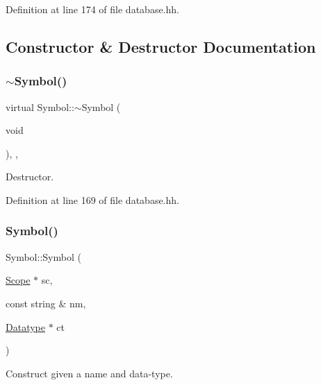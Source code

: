 Definition at line 174 of file database.\+hh.



\subsection{Constructor \& Destructor Documentation}
\mbox{\label{class_symbol_aaed4373bdbfb1cfea21a2b055da4b62b}} 
\subsubsection{\texorpdfstring{$\sim$Symbol()}{~Symbol()}}
{\footnotesize\ttfamily virtual Symbol\+::$\sim$\+Symbol (\begin{DoxyParamCaption}\item[{void}]{ }\end{DoxyParamCaption})\hspace{0.3cm}{\ttfamily [inline]}, {\ttfamily [protected]}, {\ttfamily [virtual]}}



Destructor. 



Definition at line 169 of file database.\+hh.

\mbox{\label{class_symbol_a5188e6395f982732c218279809b92a8e}} 
\subsubsection{\texorpdfstring{Symbol()}{Symbol()}\hspace{0.1cm}{\footnotesize\ttfamily [1/2]}}
{\footnotesize\ttfamily Symbol\+::\+Symbol (\begin{DoxyParamCaption}\item[{\mbox{\hyperlink{class_scope}{Scope}} $\ast$}]{sc,  }\item[{const string \&}]{nm,  }\item[{\mbox{\hyperlink{class_datatype}{Datatype}} $\ast$}]{ct }\end{DoxyParamCaption})\hspace{0.3cm}{\ttfamily [inline]}}



Construct given a name and data-\/type. 




